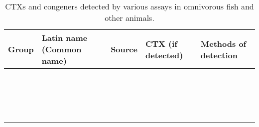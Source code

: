\documentclass[12pt]{article}
\begin{document}
\begin{table}
\caption{CTXs and congeners detected by various assays in omnivorous fish and other animals.}
\label{tbl:OmniTable}
\begin{tabular}{ | p{2cm} | p{3cm} | p{4.5cm} | p{2cm} | p{3cm} | }
\hline
\textbf{Group} & \textbf{Latin name} (Common name) & \textbf{Source} & \textbf{CTX (if detected)} & \textbf{Methods of detection} \\
\hline 
  &  \emph{} &  &  & \\
  & \emph{}  &  &  & \\
  & \emph{} &  &  & \\
  &  \emph{} &  &  & \\
  & \emph{}  &  &  & \\
  & \emph{} &  &  & \\
  &  \emph{} &  &  & \\
  & \emph{}  &  &  & \\
  & \emph{} &  &  & \\
  &  \emph{} &  &  & \\
  & \emph{}  &  &  & \\
  & \emph{} &  &  & \\
  &  \emph{} &  &  & \\
  & \emph{}  &  &  & \\
  & \emph{} &  &  & \\
  &  \emph{} &  &  & \\
  & \emph{}  &  &  & \\
  & \emph{} &  &  & \\
\end{tabular}
\end{table}
\end{document}
